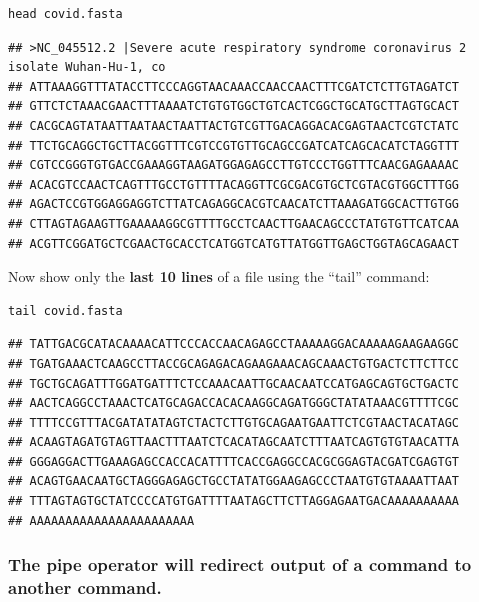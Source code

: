 \documentclass[
]{book}
\begin{document}
\begin{verbatim}
head covid.fasta
\end{verbatim}

\begin{verbatim}
## >NC_045512.2 |Severe acute respiratory syndrome coronavirus 2 isolate Wuhan-Hu-1, co
## ATTAAAGGTTTATACCTTCCCAGGTAACAAACCAACCAACTTTCGATCTCTTGTAGATCT
## GTTCTCTAAACGAACTTTAAAATCTGTGTGGCTGTCACTCGGCTGCATGCTTAGTGCACT
## CACGCAGTATAATTAATAACTAATTACTGTCGTTGACAGGACACGAGTAACTCGTCTATC
## TTCTGCAGGCTGCTTACGGTTTCGTCCGTGTTGCAGCCGATCATCAGCACATCTAGGTTT
## CGTCCGGGTGTGACCGAAAGGTAAGATGGAGAGCCTTGTCCCTGGTTTCAACGAGAAAAC
## ACACGTCCAACTCAGTTTGCCTGTTTTACAGGTTCGCGACGTGCTCGTACGTGGCTTTGG
## AGACTCCGTGGAGGAGGTCTTATCAGAGGCACGTCAACATCTTAAAGATGGCACTTGTGG
## CTTAGTAGAAGTTGAAAAAGGCGTTTTGCCTCAACTTGAACAGCCCTATGTGTTCATCAA
## ACGTTCGGATGCTCGAACTGCACCTCATGGTCATGTTATGGTTGAGCTGGTAGCAGAACT
\end{verbatim}

Now show only the \textbf{last 10 lines} of a file using the ``tail'' command:

\begin{verbatim}
tail covid.fasta
\end{verbatim}

\begin{verbatim}
## TATTGACGCATACAAAACATTCCCACCAACAGAGCCTAAAAAGGACAAAAAGAAGAAGGC
## TGATGAAACTCAAGCCTTACCGCAGAGACAGAAGAAACAGCAAACTGTGACTCTTCTTCC
## TGCTGCAGATTTGGATGATTTCTCCAAACAATTGCAACAATCCATGAGCAGTGCTGACTC
## AACTCAGGCCTAAACTCATGCAGACCACACAAGGCAGATGGGCTATATAAACGTTTTCGC
## TTTTCCGTTTACGATATATAGTCTACTCTTGTGCAGAATGAATTCTCGTAACTACATAGC
## ACAAGTAGATGTAGTTAACTTTAATCTCACATAGCAATCTTTAATCAGTGTGTAACATTA
## GGGAGGACTTGAAAGAGCCACCACATTTTCACCGAGGCCACGCGGAGTACGATCGAGTGT
## ACAGTGAACAATGCTAGGGAGAGCTGCCTATATGGAAGAGCCCTAATGTGTAAAATTAAT
## TTTAGTAGTGCTATCCCCATGTGATTTTAATAGCTTCTTAGGAGAATGACAAAAAAAAAA
## AAAAAAAAAAAAAAAAAAAAAAA
\end{verbatim}

\hypertarget{the-pipe-operator-will-redirect-output-of-a-command-to-another-command.}{%
\subsubsection*{The pipe operator will redirect output of a command to another command.}\label{the-pipe-operator-will-redirect-output-of-a-command-to-another-command.}}
\end{document}
